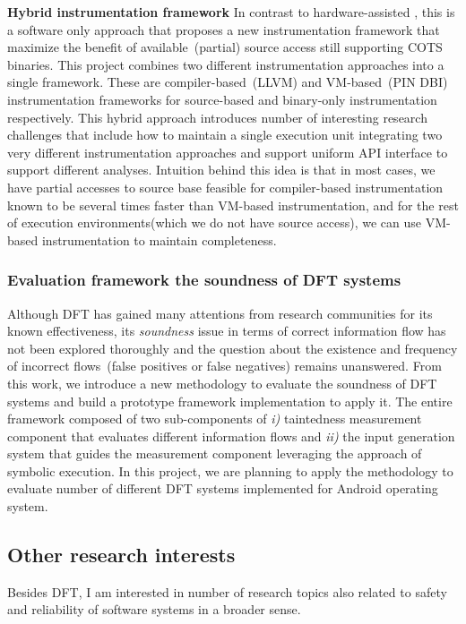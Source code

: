 \documentclass[letterpaper, 10pt]{article}
\begin{document}
\begin{small}
{\bf Hybrid instrumentation framework} In contrast to hardware-assisted \SR,
this is a software only approach that proposes a new instrumentation framework
that maximize the benefit of available~(partial) source access still supporting
COTS binaries.
%
This project combines two different instrumentation approaches into a single
framework. These are compiler-based~(LLVM) and VM-based~(PIN DBI)
instrumentation frameworks for source-based and binary-only instrumentation
respectively.
%
This hybrid approach introduces number of interesting research challenges that
include how to maintain a single execution unit integrating two very different
instrumentation approaches and support uniform API interface to support
different analyses.
%
Intuition behind this idea is that in most cases, we have partial accesses to
source base feasible for compiler-based instrumentation known to be several
times faster than VM-based instrumentation, and for the rest of execution
environments(which we do not have source access), we can use VM-based
instrumentation to maintain completeness.

\subsubsection*{Evaluation framework the soundness of DFT systems}
%
Although DFT has gained many attentions from research communities for its known
effectiveness, its {\it soundness} issue in terms of correct information flow
has not been explored thoroughly and the question about the existence and
frequency of incorrect flows~(false positives or false negatives) remains
unanswered. From this work, we introduce a new methodology to evaluate the
soundness of DFT systems and build a prototype framework implementation to
apply it.
%
The entire framework composed of two sub-components of {\it i)} taintedness
measurement component that evaluates different information flows and {\it ii)}
the input generation system that guides the measurement component leveraging
the approach of symbolic execution.
%
In this project, we are planning to apply the methodology to evaluate number of
different DFT systems implemented for Android operating system.

\subsection*{Other research interests}
%
Besides DFT, I am interested in number of research topics also related to
safety and reliability of software systems in a broader sense.


\end{small}
\end{document}

